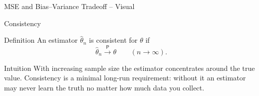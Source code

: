       \begin{frame}{MSE and Bias--Variance Tradeoff -- Visual}
        \begin{center}
          \begin{adjustbox}{max height=0.40\textheight}
          \end{adjustbox}
        \end{center}
      \end{frame}

\begin{frame}{Consistency}
  \begin{block}{Definition}
    An estimator $\hat{\theta}_n$ is consistent for $\theta$ if
    \[\hat{\theta}_n \xrightarrow{\;\mathsf{P}\;} \theta \qquad (n \to \infty).
    \]
  \end{block}

  \begin{block}{Intuition}
    With increasing sample size the estimator concentrates around the true
    value. Consistency is a minimal long-run requirement: without it an
    estimator may never learn the truth no matter how much data you collect.
  \end{block}

  \vspace{1em}
  \begin{center}
  \end{center}
\end{frame}

